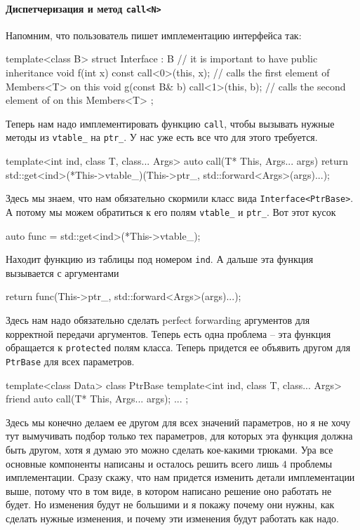 \paragraph{Диспетчеризация и метод \texttt{call<N>}}

Напомним, что пользователь пишет имплементацию интерфейса так:
\begin{cppcode}
template<class B>
struct Interface : B { // it is important to have public inheritance
  void f(int x) const {
    call<0>(this, x); // calls the first element of Members<T> on this
  }
  void g(const B& b) {
    call<1>(this, b); // calls the second element of on this Members<T>
  }
};
\end{cppcode}
Теперь нам надо имплементировать функцию \verb"call", чтобы вызывать нужные методы из \verb"vtable_" на \verb"ptr_".
У нас уже есть все что для этого требуется.
\begin{cppcode}
template<int ind, class T, class... Args>
auto call(T* This, Args... args) {
  return std::get<ind>(*This->vtable_)(This->ptr_, std::forward<Args>(args)...);
}
\end{cppcode}
Здесь мы знаем, что нам обязательно скормили класс вида \verb"Interface<PtrBase>".
А потому мы можем обратиться к его полям \verb"vtable_" и \verb"ptr_".
Вот этот кусок
\begin{cppcode}[numbers = none]
auto func = std::get<ind>(*This->vtable_);
\end{cppcode}
Находит функцию из таблицы под номером \verb"ind".
А дальше эта функция вызывается с аргументами
\begin{cppcode}[numbers = none]
return func(This->ptr_, std::forward<Args>(args)...);
\end{cppcode}
Здесь нам надо обязательно сделать perfect forwarding аргументов для корректной передачи аргументов.
Теперь есть одна проблема -- эта функция обращается к \verb"protected" полям класса.
Теперь придется ее объявить другом для \verb"PtrBase" для всех параметров.
\begin{cppcode}
template<class Data>
class PtrBase {
  template<int ind, class T, class... Args>
  friend auto call(T* This, Args... args);
  ...
};
\end{cppcode}
Здесь мы конечно делаем ее другом для всех значений параметров, но я не хочу тут вымучивать подбор только тех параметров, для которых эта функция должна быть другом, хотя я думаю это можно сделать кое-какими трюками.
Ура все основные компоненты написаны и осталось решить всего лишь $4$ проблемы имплементации.
Сразу скажу, что нам придется изменить детали имплементации выше, потому что в том виде, в котором написано решение оно работать не будет.
Но изменения будут не большими и я покажу почему они нужны, как сделать нужные изменения, и почему эти изменения будут работать как надо.

